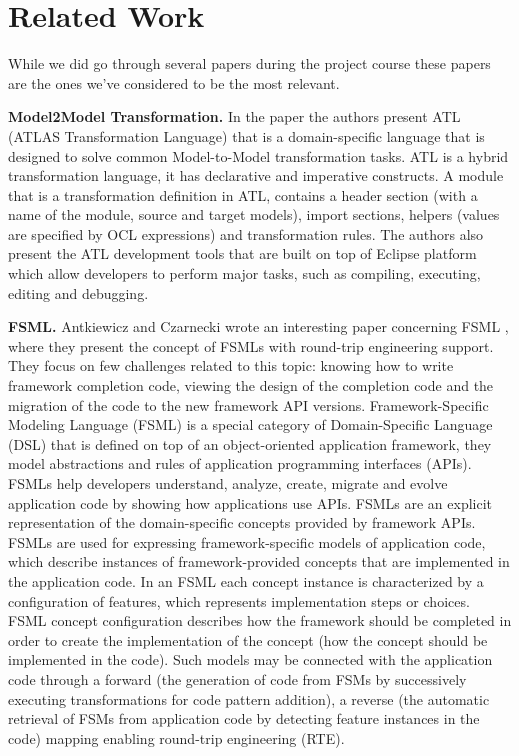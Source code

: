 \section{Related Work}
\label{relatedwork}
While we did go through several papers during the project course these papers are the ones we've considered to be the most relevant.

\textbf{Model2Model Transformation.} In the paper \cite{atl} the authors present ATL (ATLAS Transformation Language) that is a domain-specific language that is designed to solve common Model-to-Model transformation tasks. ATL is a hybrid transformation language, it has declarative and imperative constructs. A module that is a transformation definition in ATL, contains a header section (with a name of the module, source and target models), import sections, helpers (values are specified by OCL expressions) and transformation rules. The authors also present the ATL development tools that are built on top of Eclipse platform which allow developers to perform major tasks, such as compiling, executing, editing and debugging.


\textbf{FSML.} Antkiewicz and Czarnecki wrote an interesting paper concerning FSML \cite{FSML}, where they present the concept of FSMLs with round-trip engineering support. They focus on few challenges related to this topic: knowing how to write framework completion code, viewing the design of the completion code and the migration of the code to the new framework API versions. Framework-Specific Modeling Language (FSML) is a special category of Domain-Specific Language (DSL) that is defined on top of an object-oriented application framework, they model abstractions and rules of application programming interfaces (APIs). FSMLs help developers understand, analyze, create, migrate and evolve application code by showing how applications use APIs. FSMLs are an explicit representation of the domain-specific concepts provided by framework APIs. FSMLs are used for expressing framework-specific models of application code, which describe instances of framework-provided concepts that are implemented in the application code. In an FSML each concept instance is characterized by a configuration of features, which represents implementation steps or choices. FSML concept configuration describes how the framework should be completed in order to create the implementation of the concept (how the concept should be implemented in the code). Such models may be connected with the application code through a forward (the generation of code from FSMs by successively executing transformations for code pattern addition), a reverse (the automatic retrieval of FSMs from application code by detecting feature instances in the code) mapping enabling round-trip engineering (RTE).

